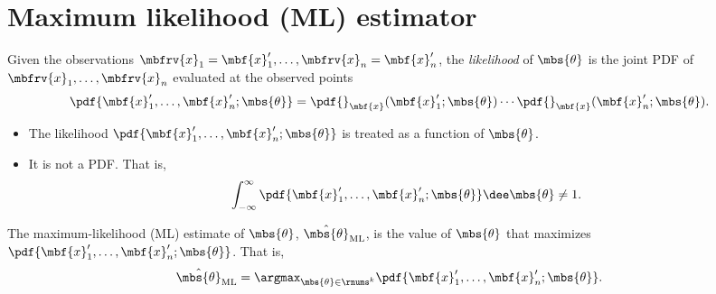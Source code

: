 \section{Maximum likelihood (ML) estimator}
\begin{mydefinition}[Likelihood]
    Given the observations $\mbfrv{x}_{1} = \mbf{x}_{1}', \ldots, \mbfrv{x}_{n}=\mbf{x}_{n}'$, the \emph{likelihood} of $\mbs{\theta}$ is the joint PDF of $\mbfrv{x}_{1},\ldots,\mbfrv{x}_{n}$ evaluated at the observed points
    \begin{align}
        \pdf{\mbf{x}_{1}',\ldots, \mbf{x}_{n}';\mbs{\theta}} &= \pdf{}_{\mbf{x}}(\mbf{x}_{1}';\mbs{\theta})\cdots\pdf{}_{\mbf{x}}(\mbf{x}_{n}';\mbs{\theta}).
    \end{align}
\end{mydefinition}
\begin{myremark}
    \begin{itemize}
        \item The likelihood $\pdf{\mbf{x}_{1}',\ldots, \mbf{x}_{n}';\mbs{\theta}}$ is treated as a function of $\mbs{\theta}$.
        \item It is not a PDF. That is,
        \begin{align}
            \int_{-\infty}^{\infty}\pdf{\mbf{x}_{1}',\ldots, \mbf{x}_{n}';\mbs{\theta}}\dee\mbs{\theta}\neq 1.
        \end{align}
    \end{itemize}
\end{myremark}

\begin{mydefinition}
    The maximum-likelihood (ML) estimate of $\mbs{\theta}$, $\hat{\mbs{\theta}}_{\mathrm{ML}}$, is the value of $\mbs{\theta}$ that maximizes $\pdf{\mbf{x}_{1}',\ldots, \mbf{x}_{n}';\mbs{\theta}}$. That is,
    \begin{align}
        \hat{\mbs{\theta}}_{\mathrm{ML}} &= \argmax_{\mbs{\theta}\in\rnums^{k}} \pdf{\mbf{x}_{1}',\ldots, \mbf{x}_{n}';\mbs{\theta}}.
    \end{align}
\end{mydefinition}

